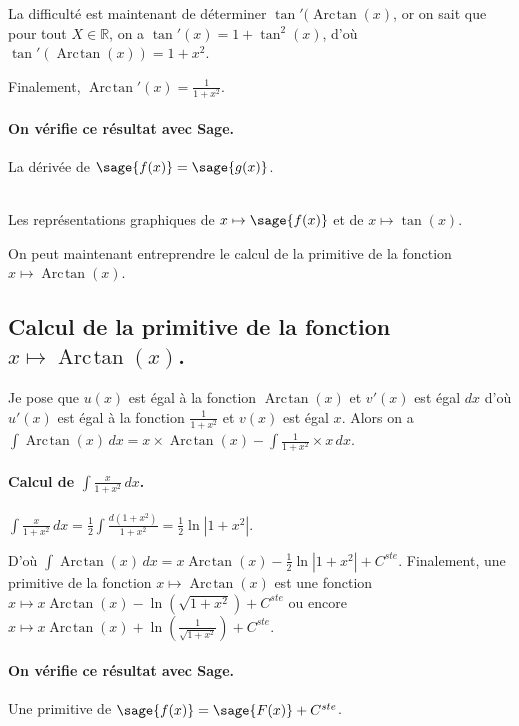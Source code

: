 \documentclass[a4paper,landscape,17pt]{extreport} %
\def\eclaire{\mathbb}
\def\R{\ensuremath{\eclaire R}}
\renewcommand{\arctan}{\mathop{\mathrm{Arc\mspace{2mu}tan}}}
\begin{document}
La difficulté est maintenant de déterminer $\tan'(\arctan(x)$, or on sait que pour tout $X \in \R$, on a $ \tan'(x) =1+\tan^2(x) $, d'où $\tan'(\arctan(x)) = 1+x^2$.

Finalement, $\arctan\nolimits'(x) = \frac{1}{1+x^2}$.
\paragraph{On vérifie ce résultat avec Sage.}
La dérivée de $\sage{f(x)} = \sage{g(x)} $.

\begin{center}
\\
Les représentations graphiques de $x \mapsto \sage{f(x)} $ et de $x\mapsto \tan(x)$.
\end{center}
On peut maintenant entreprendre le calcul de la primitive de la  fonction  $x \mapsto \arctan(x) $.


\subsection{Calcul de la primitive de la fonction  $x \mapsto \arctan(x) $.}
Je pose que $u(x)$  est égal à la fonction $\arctan(x)$ et $v'(x)$ est égal $dx$  d'où $u'(x)$  est égal à la fonction $ \frac{1}{1+ x^2} $ et $v(x)$ est égal $x$.
Alors on a $\int \arctan(x) \, dx = x \times \arctan(x) -\int \frac{1}{1+x^2} \times x \, dx $.

\paragraph{Calcul de $\int \frac{x}{1+ x^2} \, dx $.}
$\int \frac{x}{1+ x^2} \, dx = \frac{1}{2} \int \frac{d(1+x^2)}{1+ x^2} = \frac{1}{2} \ln \left| 1+ x^2 \right| $.

D'où $\int \arctan(x) \, dx = x \arctan(x) - \frac{1}{2} \ln \left| 1+ x^2 \right| + C^{ste} $. 
Finalement, une primitive de la fonction $x \mapsto \arctan(x) $ est une fonction $x \mapsto x \arctan(x) -\ln\left( \sqrt{1+ x^2}\right) + C^{ste} $ ou encore $x \mapsto x \arctan(x) +\ln\left( \frac{1}{\sqrt{1+ x^2}}\right) + C^{ste} $.
\paragraph{On vérifie ce résultat avec Sage.}
Une primitive de $\sage{f(x)} = \sage{F(x)} + C^{ste}$.

\end{document}
